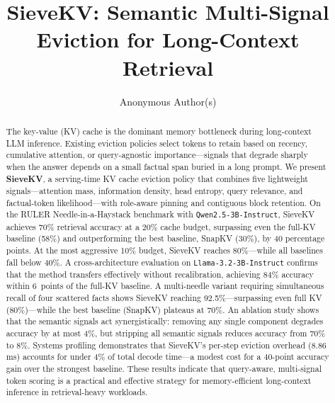 \documentclass[runningheads]{llncs}
\begin{document}
\title{SieveKV: Semantic Multi-Signal Eviction for Long-Context Retrieval}

\author{Anonymous Author(s)}

\maketitle

\begin{abstract}
The key-value (KV) cache is the dominant memory bottleneck during long-context
LLM inference.
Existing eviction policies select tokens to retain based on recency, cumulative
attention, or query-agnostic importance---signals that degrade sharply when the
answer depends on a small factual span buried in a long prompt.
We present \textbf{SieveKV}, a serving-time KV cache eviction policy that
combines five lightweight signals---attention mass, information density, head
entropy, query relevance, and factual-token likelihood---with role-aware pinning
and contiguous block retention.
On the RULER Needle-in-a-Haystack benchmark with \texttt{Qwen2.5-3B-Instruct},
SieveKV achieves 70\% retrieval accuracy at a 20\% cache budget, surpassing
even the full-KV baseline (58\%) and outperforming the best baseline, SnapKV
(30\%), by 40 percentage points.
At the most aggressive 10\% budget, SieveKV reaches 80\%---while all
baselines fall below 40\%.
A cross-architecture evaluation on \texttt{Llama-3.2-3B-Instruct} confirms that
the method transfers effectively without recalibration, achieving 84\% accuracy
within 6~points of the full-KV baseline.
A multi-needle variant requiring simultaneous recall of four scattered facts
shows SieveKV reaching 92.5\%---surpassing even full KV (80\%)---while
the best baseline (SnapKV) plateaus at 70\%.
An ablation study shows that the semantic signals act synergistically: removing
any single component degrades accuracy by at most 4\%, but stripping all
semantic signals reduces accuracy from 70\% to 8\%.
Systems profiling demonstrates that SieveKV's per-step eviction overhead
(8.86\,ms) accounts for under 4\% of total decode time---a modest cost for a
40-point accuracy gain over the strongest baseline.
These results indicate that query-aware, multi-signal token scoring is a
practical and effective strategy for memory-efficient long-context inference
in retrieval-heavy workloads.
\end{abstract}
\end{document}
